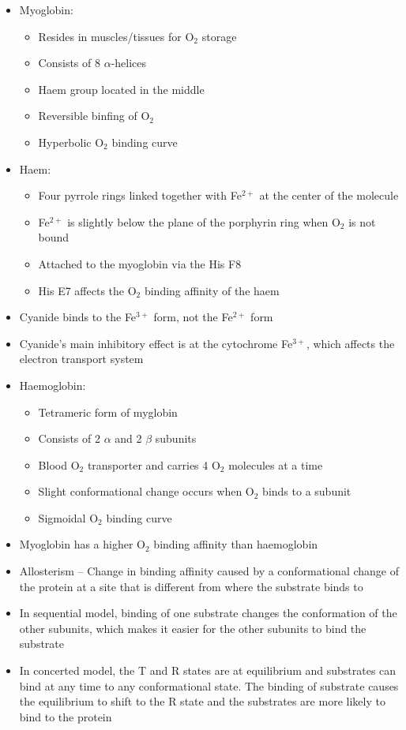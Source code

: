 \begin{itemize}
	\item Myoglobin:
		\begin{itemize}
			\item Resides in muscles/tissues for O$_2$ storage
			\item Consists of 8 $\alpha$-helices
			\item Haem group located in the middle
			\item Reversible binfing of O$_2$
			\item Hyperbolic O$_2$ binding curve
		\end{itemize}
	\item Haem:
		\begin{itemize}
			\item Four pyrrole rings linked together with Fe$^{2+}$ at the center of the molecule
			\item Fe$^{2+}$ is slightly below the plane of the porphyrin ring when O$_2$ is not bound
			\item Attached to the myoglobin via the His F8
			\item His E7 affects the O$_2$ binding affinity of the haem
		\end{itemize}
	\item Cyanide binds to the Fe$^{3+}$ form, not the Fe$^{2+}$ form
	\item Cyanide's main inhibitory effect is at the cytochrome Fe$^{3+}$, which affects the electron transport system
	\item Haemoglobin:
		\begin{itemize}
			\item Tetrameric form of myglobin
			\item Consists of 2 $\alpha$ and 2 $\beta$ subunits
			\item Blood O$_2$ transporter and carries 4 O$_2$ molecules at a time
			\item Slight conformational change occurs when O$_2$ binds to a subunit
			\item Sigmoidal O$_2$ binding curve
		\end{itemize}
	\item Myoglobin has a higher O$_2$ binding affinity than haemoglobin
	\item Allosterism -- Change in binding affinity caused by a conformational change of the protein at a site that is different from where the substrate binds to
	\item In sequential model, binding of one substrate changes the conformation of the other subunits, which makes it easier for the other subunits to bind the substrate
	\item In concerted model, the T and R states are at equilibrium and substrates can bind at any time to any conformational state. The binding of substrate causes the equilibrium to shift to the R state and the substrates are more likely to bind to the protein
\end{itemize}
